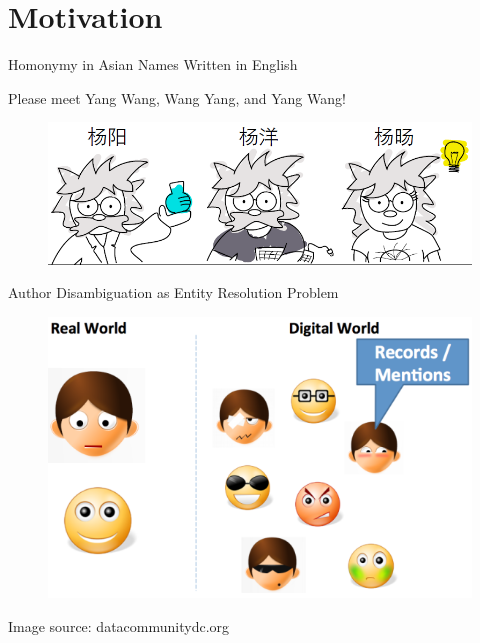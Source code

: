 \documentclass{beamer}
\begin{document}

\section{Motivation}

\begin{frame}{Homonymy in Asian Names Written in English}

Please meet Yang Wang, Wang Yang, and Yang Wang!

\begin{figure}
   \centering
   \includegraphics[width=\textwidth]{./figures/homonym.png}
\end{figure}

\end{frame}




\begin{frame}{Author Disambiguation as Entity Resolution Problem}

\begin{figure}
   \centering
   \includegraphics[width=\textwidth]{./figures/entity_resolution.png}
\end{figure}

Image source: datacommunitydc.org
\end{frame}
\end{document}
